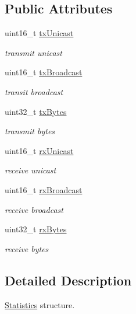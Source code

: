 \subsection*{Public Attributes}
\begin{DoxyCompactItemize}
\item 
uint16\+\_\+t \hyperlink{structns3_1_1flame_1_1FlameProtocolMac_1_1Statistics_a536fc0b2aeb6ac3d81221a6ed9ca07e2}{tx\+Unicast}
\begin{DoxyCompactList}\small\item\em transmit unicast \end{DoxyCompactList}\item 
uint16\+\_\+t \hyperlink{structns3_1_1flame_1_1FlameProtocolMac_1_1Statistics_a623867ef050869878f117b897c84ad3c}{tx\+Broadcast}
\begin{DoxyCompactList}\small\item\em transit broadcast \end{DoxyCompactList}\item 
uint32\+\_\+t \hyperlink{structns3_1_1flame_1_1FlameProtocolMac_1_1Statistics_a66c4802b2e3e3f367de9b842e36d9536}{tx\+Bytes}
\begin{DoxyCompactList}\small\item\em transmit bytes \end{DoxyCompactList}\item 
uint16\+\_\+t \hyperlink{structns3_1_1flame_1_1FlameProtocolMac_1_1Statistics_a6de469d2dffb7dad53e67a0d5e4c7c3d}{rx\+Unicast}
\begin{DoxyCompactList}\small\item\em receive unicast \end{DoxyCompactList}\item 
uint16\+\_\+t \hyperlink{structns3_1_1flame_1_1FlameProtocolMac_1_1Statistics_afaa1e959738fc658e689eb501b66a357}{rx\+Broadcast}
\begin{DoxyCompactList}\small\item\em receive broadcast \end{DoxyCompactList}\item 
uint32\+\_\+t \hyperlink{structns3_1_1flame_1_1FlameProtocolMac_1_1Statistics_a519e7e2a79a3b16700f633672c97ff76}{rx\+Bytes}
\begin{DoxyCompactList}\small\item\em receive bytes \end{DoxyCompactList}\end{DoxyCompactItemize}


\subsection{Detailed Description}
\hyperlink{structns3_1_1flame_1_1FlameProtocolMac_1_1Statistics}{Statistics} structure. 

